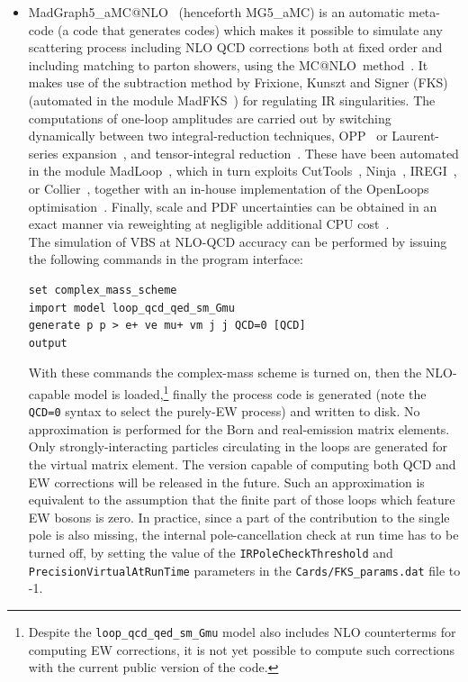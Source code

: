 \documentclass[twocolumn,epjc3]{svjour3} %
\begin{document}
\begin{itemize}
      \item {\sc MadGraph5\_aMC@NLO}~\cite{Alwall:2014hca} (henceforth {\sc MG5\-\_aMC}) is an automatic meta-code (a code that generates codes) which makes it possible to simulate any scattering process
          including NLO QCD corrections both at fixed order and including matching to parton showers, using the {\sc MC@NLO}\ method~\cite{Frixione:2002ik}. It makes use of the subtraction method by Frixione, Kunszt and Signer (FKS)~\cite{Frixione:1995ms,
            Frixione:1997np} (automated in the module {\sc MadFKS}~\cite{Frederix:2009yq,
            Frederix:2016rdc}) for regulating IR singularities. The computations of one-loop amplitudes are carried out by switching dynamically between
            two integral-reduction techniques, OPP~\cite{Ossola:2006us} or Laurent-series expansion~\cite{Mastrolia:2012bu},
            and tensor-integral reduction~\cite{Passarino:1978jh,Davydychev:1991va,Denner:2005nn}. These have been automated in the module {\sc MadLoop}~\cite{Hirschi:2011pa}, which
            in turn exploits {\sc CutTools}~\cite{Ossola:2007ax}, {\sc Ninja}~\cite{Peraro:2014cba,
            Hirschi:2016mdz}, {\sc IREGI}~\cite{ShaoIREGI}, or {\sc Collier}~\cite{Denner:2016kdg}, together with an in-house 
            implementation of the {\sc OpenLoops} optimisation~\cite{Cascioli:2011va}. Finally, scale and PDF uncertainties can be obtained in an exact manner via reweighting
            at negligible additional CPU cost~\cite{Frederix:2011ss}.\\
            The simulation of VBS at NLO-QCD accuracy can be performed by issuing the following commands in the program interface:
    \begin{verbatim}
set complex_mass_scheme
import model loop_qcd_qed_sm_Gmu
generate p p > e+ ve mu+ vm j j QCD=0 [QCD]
output
    \end{verbatim}
      With these commands the complex-mass scheme is turned on, then the NLO-capable model is loaded,\footnote{Despite
                the {\tt loop\_qcd\_qed\_sm\_Gmu} model also includes NLO counterterms for computing EW corrections, it is not yet possible to compute such corrections
            with the current public version of the code.} finally the process code is generated (note the {\tt QCD=0} syntax to select the purely-EW process)
            and written to disk. No approximation is performed for the Born and real-emission matrix elements. 
            Only strongly-in\-ter\-act\-ing particles circulating in the loops are generated for the virtual matrix element.
            The version capable of computing both QCD and EW corrections will be released in the future.
            Such an approximation is equivalent to the assumption that the finite part of
            those loops which feature EW bosons is zero. In practice, since a part of the contribution to the single pole is also missing, the internal 
            pole-cancellation check at run time has to be turned off, by setting the value of the {\tt IR\-Pole\-Check\-Threshold} and 
            {\tt Precision\-Virtual\-At\-Run\-Time} parameters in the {\tt Cards\-/FKS\_\-params.dat} file to -1.


\end{itemize}
\end{document}
